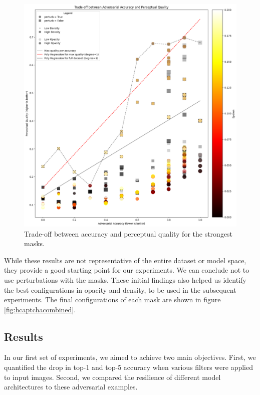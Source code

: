 \documentclass[a4paper, oneside]{discothesis}
\begin{document}
\begin{figure}
	\centering
	\includegraphics[width=1\columnwidth]{figures/tradeoff-2.png}
	\caption{Trade-off between accuracy and perceptual quality for the strongest masks.}
	\label{fig:tradeoff-2}
\end{figure}

While these results are not representative of the entire dataset or model space, they provide a good starting point for our experiments. We can conclude not to use perturbations with the masks. These initial findings also helped us identify the best configurations in opacity and density, to be used in the subsequent experiments. The final configurations of each mask are shown in figure \ref{fig:hcaptchacombined}.

\subsection{Results}

In our first set of experiments, we aimed to achieve two main objectives. First, we quantified the drop in top-1 and top-5 accuracy when various filters were applied to input images. Second, we compared the resilience of different model architectures to these adversarial examples.
\end{document}
